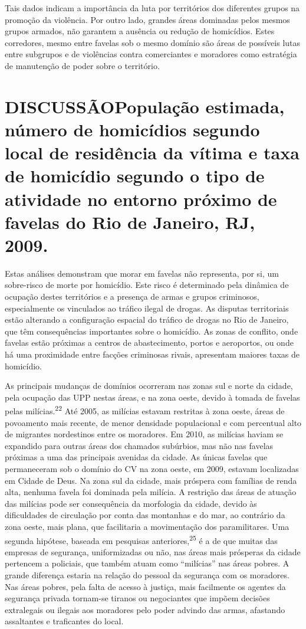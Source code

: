\documentclass{article}
\begin{document}
Tais dados indicam a importância da luta por territórios dos diferentes grupos
na promoção da violência. Por outro lado, grandes áreas dominadas pelos mesmos
grupos armados, não garantem a ausência ou redução de homicídios. Estes
corredores, mesmo entre favelas sob o mesmo domínio são áreas de possíveis lutas
entre subgrupos e de violências contra comerciantes e moradores como estratégia
de manutenção de poder sobre o território.

\section{DISCUSSÃOPopulação estimada, número de homicídios segundo local de
residência da vítima e taxa de homicídio segundo o tipo de atividade no entorno
próximo de favelas do Rio de Janeiro, RJ, 2009.}

Estas análises demonstram que morar em favelas não representa, por si, um
sobre-risco de morte por homicídio. Este risco é determinado pela dinâmica de
ocupação destes territórios e a presença de armas e grupos criminosos,
especialmente os vinculados ao tráfico ilegal de drogas. As disputas
territoriais estão alterando a configuração espacial do tráfico de drogas no Rio
de Janeiro, que têm consequências importantes sobre o homicídio. As zonas de
conflito, onde favelas estão próximas a centros de abastecimento, portos e
aeroportos, ou onde há uma proximidade entre facções criminosas rivais,
apresentam maiores taxas de homicídio.

As principais mudanças de domínios ocorreram nas zonas sul e norte da cidade,
pela ocupação das UPP nestas áreas, e na zona oeste, devido à tomada de favelas
pelas milícias.\textsuperscript{22}
Até 2005, as milícias estavam restritas à zona oeste, áreas de povoamento mais
recente, de menor densidade populacional e com percentual alto de migrantes
nordestinos entre os moradores. Em 2010, as milícias haviam se expandido para
outras áreas dos chamados subúrbios, mas não nas favelas próximas a uma das
principais avenidas da cidade. As únicas favelas que permaneceram sob o domínio
do CV na zona oeste, em 2009, estavam localizadas em Cidade de Deus. Na zona sul
da cidade, mais próspera com famílias de renda alta, nenhuma favela foi dominada
pela milícia. A restrição das áreas de atuação das milícias pode ser
consequência da morfologia da cidade, devido às dificuldades de circulação por
conta das montanhas e do mar, ao contrário da zona oeste, mais plana, que
facilitaria a movimentação dos paramilitares. Uma segunda hipótese, baseada em
pesquisas anteriores,\textsuperscript{25}
é a de que muitas das empresas de segurança, uniformizadas ou não, nas áreas
mais prósperas da cidade pertencem a policiais, que também atuam como “milícias”
nas áreas pobres. A grande diferença estaria na relação do pessoal da segurança
com os moradores. Nas áreas pobres, pela falta de acesso à justiça, mais
facilmente os agentes da segurança privada tornam-se tiranos ou negociantes que
impõem decisões extralegais ou ilegais aos moradores pelo poder advindo das
armas, afastando assaltantes e traficantes do local.
\end{document}
